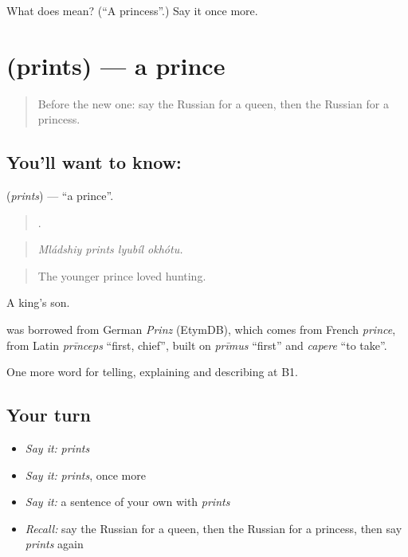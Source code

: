 \begin{tcolorbox}[breakable,colback=teal!4,colframe=teal!35!black,title={Before you move on}]
What does  mean? (\textquotedblleft{}A princess\textquotedblright{}.) Say it once more.
\end{tcolorbox}
\section[\texorpdfstring{\ru{принц} (prints)}{принц (prints)}]{ (prints) — a prince}

\label{lesson:RU-C321-prints}



\begin{quote}
Before the new one: say the Russian for a queen, then the Russian for a princess.
\end{quote}

\subsection*{You'll want to know: }
\textbf{} (\emph{prints}) — \textquotedblleft{}a prince\textquotedblright{}.

\begin{quote}
   .
\end{quote}

\begin{quote}
\emph{Mládshiy prints lyubíl okhótu.}
\end{quote}

\begin{quote}
The younger prince loved hunting.
\end{quote}

A king's son.

\begin{cousinweb}
\emph{} was borrowed from German \emph{Prinz} (EtymDB), which comes from French \emph{prince}, from Latin \emph{prīnceps} \textquotedblleft{}first, chief\textquotedblright{}, built on \emph{prīmus} \textquotedblleft{}first\textquotedblright{} and \emph{capere} \textquotedblleft{}to take\textquotedblright{}.
\end{cousinweb}

\begin{grammarlens}[title={What you've built}]
One more word for telling, explaining and describing at B1.
\end{grammarlens}

\subsection*{Your turn}
\begin{itemize}
\raggedright
  \item \emph{Say it:} \emph{prints}
  \item \emph{Say it:} \emph{prints}, once more
  \item \emph{Say it:} a sentence of your own with \emph{prints}
  \item \emph{Recall:} say the Russian for a queen, then the Russian for a princess, then say \emph{prints} again
\end{itemize}

